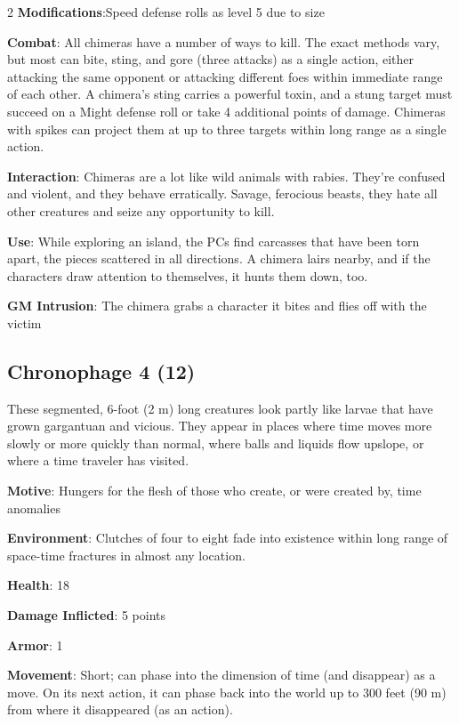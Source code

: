 \begin{multicols}{2}
\textbf{Modifications}:Speed defense rolls as level 5 due to size

\textbf{Combat}: All chimeras have a number of ways to kill. The exact methods vary, but most can bite, sting, and gore (three attacks) as a single action, either attacking the same opponent or attacking different foes within immediate range of each other. A chimera’s sting carries a powerful toxin, and a stung target must succeed on a Might defense roll or take 4 additional points of damage. Chimeras with spikes can project them at up to three targets within long range as a single action.

\textbf{Interaction}: Chimeras are a lot like wild animals with rabies. They’re confused and violent, and they behave erratically. Savage, ferocious beasts, they hate all other creatures and seize any opportunity to kill.

\textbf{Use}: While exploring an island, the PCs find carcasses that have been torn apart, the pieces scattered in all directions. A chimera lairs nearby, and if the characters draw attention to themselves, it hunts them down, too.

\textbf{GM Intrusion}: The chimera grabs a character it bites and flies off with the victim

\subsection{Chronophage	4 (12)}

These segmented, 6-foot (2 m) long creatures look partly like larvae that have grown gargantuan and vicious. They appear in places where time moves more slowly or more quickly than normal, where balls and liquids flow upslope, or where a time traveler has visited.

\textbf{Motive}: Hungers for the flesh of those who create, or were created by, time anomalies

\textbf{Environment}: Clutches of four to eight fade into existence within long range of space-time fractures in almost any location.

\textbf{Health}: 18

\textbf{Damage Inflicted}: 5 points

\textbf{Armor}: 1

\textbf{Movement}: Short; can phase into the dimension of time (and disappear) as a move. On its next action, it can phase back into the world up to 300 feet (90 m) from where it disappeared (as an action).


\end{multicols}
